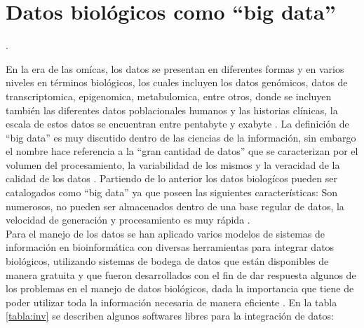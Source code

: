 \section{Datos biológicos como “big data”}.

En la era de las omícas, los datos se presentan en diferentes formas y en varios niveles en términos biológicos, los cuales incluyen los datos genómicos, datos de transcriptomica, epigenomica, metabulomica, entre otros, donde se incluyen también las diferentes datos poblacionales humanos y las historias clínicas, la escala de estos datos se encuentran  entre  pentabyte y exabyte \cite{Li2014}. La definición de “big data” es muy discutido dentro de las ciencias de la información, sin embargo el nombre  hace referencia a la “gran cantidad de datos” que se caracterizan por el volumen del procesamiento, la variabilidad de los mismos y la veracidad de la calidad de los datos \cite{Li2014}. Partiendo de lo anterior los datos biologícos pueden ser catalogados como “big data” ya que poseen las siguientes características: Son numerosos, no pueden ser almacenados dentro de una base regular de datos, la velocidad  de generación y procesamiento es muy rápida \cite{Hashem2015}. \\

Para el manejo de los datos se han aplicado varios modelos de sistemas de información en  bioinformática con diversas herramientas para integrar datos biológicos, utilizando sistemas de bodega de datos que están disponibles de manera gratuita y que fueron desarrollados con el fin de dar respuesta algunos de los problemas en el manejo de datos biológicos, dada la importancia que tiene de poder utilizar toda la información necesaria de manera eficiente \cite{Triplet2014}. En la tabla \ref{tabla:inv} se describen algunos softwares libres para la integración de datos: 

